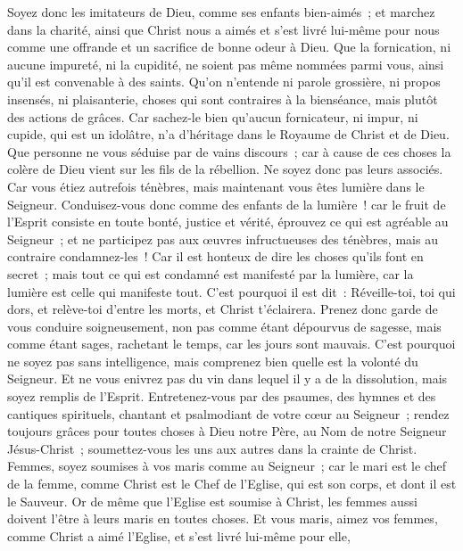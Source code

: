 \begin{multicols}{2}
\VerseOne{}Soyez donc les imitateurs de Dieu, comme ses enfants bien-aimés~;
et marchez dans la charité, ainsi que Christ nous a aimés et s'est livré lui-même pour nous comme une offrande et un sacrifice de bonne odeur à Dieu.
Que la fornication, ni aucune impureté, ni la cupidité, ne soient pas même nommées parmi vous, ainsi qu'il est convenable à des saints.
Qu'on n'entende ni parole grossière, ni propos insensés, ni plaisanterie, choses qui sont contraires à la bienséance, mais plutôt des actions de grâces.
Car sachez-le bien qu'aucun fornicateur, ni impur, ni cupide, qui est un idolâtre, n'a d'héritage dans le Royaume de Christ et de Dieu.
Que personne ne vous séduise par de vains discours~; car à cause de ces choses la colère de Dieu vient sur les fils de la rébellion.
Ne soyez donc pas leurs associés.
Car vous étiez autrefois ténèbres, mais maintenant vous êtes lumière dans le Seigneur. Conduisez-vous donc comme des enfants de la lumière~!
car le fruit de l'Esprit consiste en toute bonté, justice et vérité,
éprouvez ce qui est agréable au Seigneur~;
et ne participez pas aux œuvres infructueuses des ténèbres, mais au contraire condamnez-les~!
Car il est honteux de dire les choses qu'ils font en secret~;
mais tout ce qui est condamné est manifesté par la lumière, car la lumière est celle qui manifeste tout.
C'est pourquoi il est dit~: Réveille-toi, toi qui dors, et relève-toi d'entre les morts, et Christ t'éclairera.
Prenez donc garde de vous conduire soigneusement, non pas comme étant dépourvus de sagesse, mais comme étant sages,
rachetant le temps, car les jours sont mauvais.
C'est pourquoi ne soyez pas sans intelligence, mais comprenez bien quelle est la volonté du Seigneur.
Et ne vous enivrez pas du vin dans lequel il y a de la dissolution, mais soyez remplis de l'Esprit.
Entretenez-vous par des psaumes, des hymnes et des cantiques spirituels, chantant et psalmodiant de votre cœur au Seigneur~;
rendez toujours grâces pour toutes choses à Dieu notre Père, au Nom de notre Seigneur Jésus-Christ~;
soumettez-vous les uns aux autres dans la crainte de Christ.
Femmes, soyez soumises à vos maris comme au Seigneur~;
car le mari est le chef de la femme, comme Christ est le Chef de l'Eglise, qui est son corps, et dont il est le Sauveur.
Or de même que l'Eglise est soumise à Christ, les femmes aussi doivent l'être à leurs maris en toutes choses.
Et vous maris, aimez vos femmes, comme Christ a aimé l'Eglise, et s'est livré lui-même pour elle,

\end{multicols}
